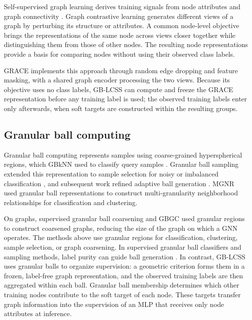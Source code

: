 \documentclass[10pt,letterpaper,nopreprintline]{elsarticle}
\theoremstyle{definition}
\theoremstyle{plain}
\begin{document}
Self-supervised graph learning derives training signals from node attributes and graph connectivity \cite{ref57}. Graph contrastive learning generates different views of a graph by perturbing its structure or attributes. A common node-level objective brings the representations of the same node across views closer together while distinguishing them from those of other nodes. The resulting node representations provide a basis for comparing nodes without using their observed class labels.

GRACE \cite{ref12} implements this approach through random edge dropping and feature masking, with a shared graph encoder processing the two views. Because its objective uses no class labels, GB-LCSS can compute and freeze the GRACE representation before any training label is used; the observed training labels enter only afterwards, when soft targets are constructed within the resulting groups.

\subsection{Granular ball computing}\label{sec:2.5}

Granular ball computing represents samples using coarse-grained hyperspherical regions, which GBkNN used to classify query samples \cite{ref13}. Granular ball sampling extended this representation to sample selection for noisy or imbalanced classification \cite{ref15}, and subsequent work refined adaptive ball generation \cite{ref16}. MGNR \cite{ref58} used granular ball representations to construct multi-granularity neighborhood relationships for classification and clustering.

On graphs, supervised granular ball coarsening \cite{ref66} and GBGC \cite{ref67} used granular regions to construct coarsened graphs, reducing the size of the graph on which a GNN operates. The methods above use granular regions for classification, clustering, sample selection, or graph coarsening. In supervised granular ball classifiers and sampling methods, label purity can guide ball generation \cite{ref13,ref15,ref16}. In contrast, GB-LCSS uses granular balls to organize supervision: a geometric criterion forms them in a frozen, label-free graph representation, and the observed training labels are then aggregated within each ball. Granular ball membership determines which other training nodes contribute to the soft target of each node. These targets transfer graph information into the supervision of an MLP that receives only node attributes at inference.
\end{document}
